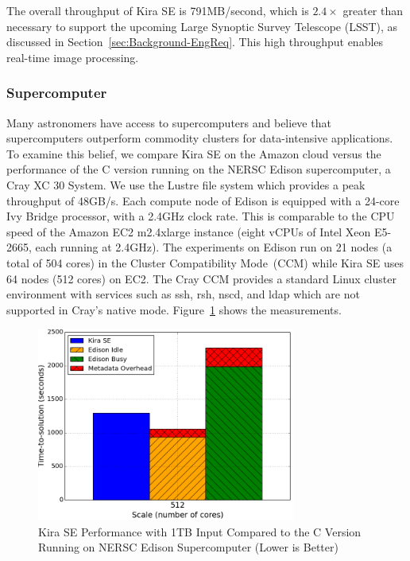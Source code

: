 \documentclass[conference]{IEEEtran}
\newcommand{\up}{\vspace*{-1em}}
\begin{document}
The overall throughput of Kira SE is 791MB/second, which is $2.4\times$ greater than necessary
to support the upcoming Large Synoptic Survey Telescope (LSST), as discussed in
Section~\ref{sec:Background-EngReq}. This high throughput enables real-time image processing.

\subsubsection{Supercomputer}

Many astronomers have access to supercomputers and believe that
supercomputers outperform commodity clusters for data-intensive applications.
To examine this belief, we compare Kira SE on the Amazon cloud versus the performance of
the C version running on the NERSC Edison supercomputer, a Cray XC 30 System. We use
the Lustre file system which provides a peak throughput of 48GB/s. Each compute
node of Edison is equipped with a 24-core Ivy Bridge processor, with a 2.4GHz clock rate.
This is comparable to the CPU speed of the Amazon EC2 m2.4xlarge instance (eight vCPUs of
Intel Xeon E5-2665, each running at 2.4GHz). The experiments on Edison run on 21
nodes (a total of 504 cores) in the Cluster Compatibility Mode~(CCM)
while Kira SE uses 64 nodes (512 cores) on EC2. The Cray CCM provides a 
standard Linux cluster environment with services such as ssh, rsh, nscd, and ldap which 
are not supported in Cray's native mode.
Figure~\ref{fig:1tb-edison} shows the measurements.

\begin{figure}[h]
	\begin{center}
		\includegraphics[width=85mm]{pictures/1TB-edison}
		\caption{Kira SE Performance with 1TB Input Compared to the C Version Running on NERSC Edison Supercomputer (Lower is Better)
		\label{fig:1tb-edison}}
		\up
  	\end{center}
\end{figure}
\end{document}
